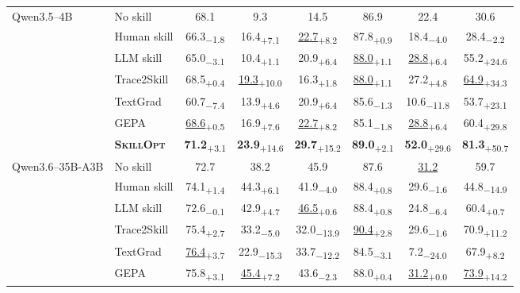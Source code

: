 \documentclass[
]{article}
\providecommand{\mrowcell}{}
\newcommand{\ourmethod}{\textsc{SkillOpt}\xspace}
\newcommand{\dvalp}[2]{\hphantom{\textsubscript{+#2}}#1\textsubscript{\textcolor{deltapos}{+#2}}}
\newcommand{\dvaln}[2]{\hphantom{\textsubscript{$-$#2}}#1\textsubscript{\textcolor{deltaneg}{$-$#2}}}
\newcommand{\methodcell}[1]{\cellcolor{blue!8}#1}
\begin{document}
\begin{table}[!htbp]
\begin{tabular}{l l c c c c c c}
\cmidrule(lr){1-8}
\multirow{7}{*}{Qwen3.5--4B} & No skill & 68.1 & 9.3 & 14.5 & 86.9 & 22.4 & 30.6 \\
\mrowcell & Human skill & \dvaln{66.3}{1.8} & \dvalp{16.4}{7.1} & \dvalp{\underline{22.7}}{8.2} & \dvalp{87.8}{0.9} & \dvaln{18.4}{4.0} & \dvaln{28.4}{2.2} \\
\mrowcell & LLM skill & \dvaln{65.0}{3.1} & \dvalp{10.4}{1.1} & \dvalp{20.9}{6.4} & \dvalp{\underline{88.0}}{1.1} & \dvalp{\underline{28.8}}{6.4} & \dvalp{55.2}{24.6} \\
\mrowcell & Trace2Skill & \dvalp{68.5}{0.4} & \dvalp{\underline{19.3}}{10.0} & \dvalp{16.3}{1.8} & \dvalp{\underline{88.0}}{1.1} & \dvalp{27.2}{4.8} & \dvalp{\underline{64.9}}{34.3} \\
\mrowcell & TextGrad & \dvaln{60.7}{7.4} & \dvalp{13.9}{4.6} & \dvalp{20.9}{6.4} & \dvaln{85.6}{1.3} & \dvaln{10.6}{11.8} & \dvalp{53.7}{23.1} \\
\mrowcell & GEPA & \dvalp{\underline{68.6}}{0.5} & \dvalp{16.9}{7.6} & \dvalp{\underline{22.7}}{8.2} & \dvaln{85.1}{1.8} & \dvalp{\underline{28.8}}{6.4} & \dvalp{60.4}{29.8} \\
\mrowcell & \methodcell{\textbf{\ourmethod{}}} & \methodcell{\dvalp{\textbf{71.2}}{3.1}} & \methodcell{\dvalp{\textbf{23.9}}{14.6}} & \methodcell{\dvalp{\textbf{29.7}}{15.2}} & \methodcell{\dvalp{\textbf{89.0}}{2.1}} & \methodcell{\dvalp{\textbf{52.0}}{29.6}} & \methodcell{\dvalp{\textbf{81.3}}{50.7}} \\
\cmidrule(lr){1-8}
\multirow{7}{*}{Qwen3.6--35B-A3B} & No skill & 72.7 & 38.2 & 45.9 & 87.6 & \underline{31.2} & 59.7 \\
\mrowcell & Human skill & \dvalp{74.1}{1.4} & \dvalp{44.3}{6.1} & \dvaln{41.9}{4.0} & \dvalp{88.4}{0.8} & \dvaln{29.6}{1.6} & \dvaln{44.8}{14.9} \\
\mrowcell & LLM skill & \dvaln{72.6}{0.1} & \dvalp{42.9}{4.7} & \dvalp{\underline{46.5}}{0.6} & \dvalp{88.4}{0.8} & \dvaln{24.8}{6.4} & \dvalp{60.4}{0.7} \\
\mrowcell & Trace2Skill & \dvalp{75.4}{2.7} & \dvaln{33.2}{5.0} & \dvaln{32.0}{13.9} & \dvalp{\underline{90.4}}{2.8} & \dvaln{29.6}{1.6} & \dvalp{70.9}{11.2} \\
\mrowcell & TextGrad & \dvalp{\underline{76.4}}{3.7} & \dvaln{22.9}{15.3} & \dvaln{33.7}{12.2} & \dvaln{84.5}{3.1} & \dvaln{7.2}{24.0} & \dvalp{67.9}{8.2} \\
\mrowcell & GEPA & \dvalp{75.8}{3.1} & \dvalp{\underline{45.4}}{7.2} & \dvaln{43.6}{2.3} & \dvalp{88.0}{0.4} & \dvalp{\underline{31.2}}{0.0} & \dvalp{\underline{73.9}}{14.2} \\

\end{tabular}
\end{table}
\end{document}
